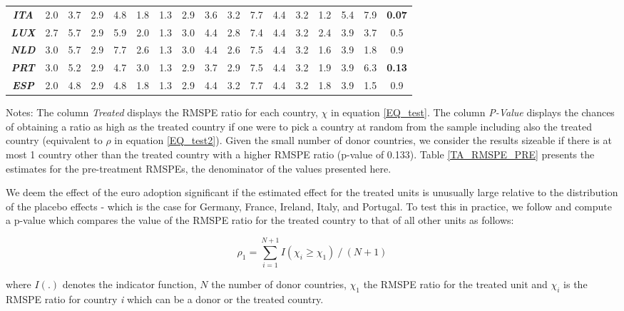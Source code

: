 \documentclass[12pt]{article}
\newcommand{\annote}[1]{\parbox{\textwidth}{\renewcommand{\baselinestretch}{1.0}\vspace{12pt} \small Notes: #1}}
\begin{document}
\begin{table}[htbp!]
\begin{tabular}{c|cccccccccccccc|c||c}
\textit{\textbf{ITA}} & 2.0 & 3.7 & 2.9 & 4.8 & 1.8 & 1.3 & 2.9 & 3.6 & 3.2 & 7.7 & 4.4 & 3.2 & 1.2 & 5.4 & 7.9  & \textbf{0.07} \\
\textit{\textbf{LUX}} & 2.7 & 5.7 & 2.9 & 5.9 & 2.0 & 1.3 &  3.0 & 4.4 & 2.8 & 7.4 & 4.4 & 3.2 & 2.4 & 3.9 & 3.7 & 0.5  \\
\textit{\textbf{NLD}} & 3.0 & 5.7 & 2.9 & 7.7 & 2.6 & 1.3 & 3.0 & 4.4 & 2.6 & 7.5 & 4.4 & 3.2 & 1.6 & 3.9 & 1.8  & 0.9  \\
\textit{\textbf{PRT}} & 3.0 & 5.2 & 2.9 & 4.7 & 3.0 & 1.3 & 2.9 & 3.7 & 2.9 & 7.5 & 4.4 & 3.2 & 1.9 & 3.9 & 6.3  & \textbf{0.13} \\
\textit{\textbf{ESP}} & 2.0 & 4.8 & 2.9 & 4.8 & 1.8 & 1.3 & 2.9 & 4.4 & 3.2 & 7.7 & 4.4 & 3.2 & 1.8 & 3.9 & 1.5  & 0.9 \\
\bottomrule
\end{tabular} 
\annote{The column \textit{Treated} displays the RMSPE ratio for each country, $\chi$ in equation \ref{EQ_test}. The column \textit{P-Value} displays the chances of obtaining a ratio as high as the treated country if one were to pick a country at random from the sample including also the treated country (equivalent to $\rho$ in equation \ref{EQ_test2}). Given the small number of donor countries, we consider the results sizeable if there is at most 1 country other than the treated country with a higher RMSPE ratio (p-value of 0.133). Table \ref{TA_RMSPE_PRE} presents the estimates for the pre-treatment RMSPEs, the denominator of the values presented here.}
\end{table}

We deem the effect of the euro adoption significant if the estimated effect for the treated units is unusually large relative to the distribution of the placebo effects - which is the case for Germany, France, Ireland, Italy, and Portugal. To test this in practice, we follow \cite{Abadie2015} and compute a p-value which compares the value of the RMSPE ratio for the treated country to that of all other units as follows:

\begin{equation}
\label{EQ_test2}
    \rho_1 = \sum\limits_{i=1}^{N+1} I(\chi_i \geq \chi_1) \ / \ (N+1)
\end{equation}

where $I(.)$ denotes the indicator function, $N$ the number of donor countries, $\chi_1$ the RMSPE ratio for the treated unit and $\chi_i$ is the RMSPE ratio for country \textit{i} which can be a donor or the treated country. 
\end{document}
